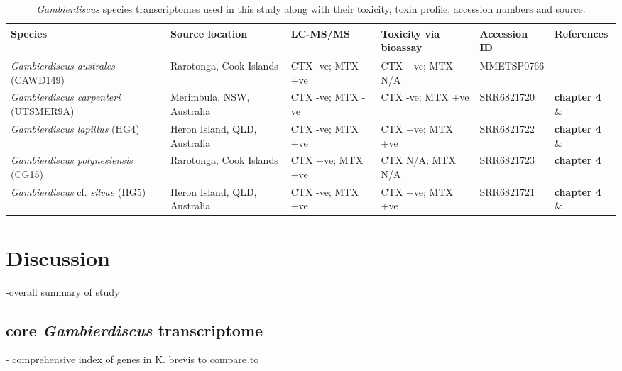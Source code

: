 \documentclass[12pt]{article}
\begin{document}
\begin{table}
\caption{\emph{Gambierdiscus} species transcriptomes used in this study along with their toxicity, toxin profile, accession numbers and source.}
\label{tbl:SeqTable}
\begin{tabular}{ | p{3cm} | p{2cm} | p{2.5cm} | p{2.5cm} | p{2cm} | p{2cm}|}
\hline
\textbf{Species} & \textbf{Source location}&\textbf{LC-MS/MS} & \textbf{Toxicity via bioassay} & \textbf{Accession ID} & \textbf{References} \\
\hline
\textit{Gambierdiscus australes} (CAWD149)&Rarotonga, Cook Islands& CTX -ve; MTX +ve&CTX +ve; MTX N/A&MMETSP0766&\cite{keeling2014marine,rhodes2010toxic,rhodes2014production,munday2017ciguatoxins}\\
\hline
\textit{Gambierdiscus carpenteri} (UTSMER9A)&Merimbula, NSW, Australia&CTX -ve; MTX -ve&CTX -ve; MTX +ve&SRR6821720
&\textbf{chapter 4} \& \cite{larsson2018toxicology}\\
\hline
\textit{Gambierdiscus lapillus} (HG4)&Heron Island, QLD, Australia&CTX -ve; MTX +ve&CTX +ve; MTX +ve&SRR6821722
&\textbf{chapter 4} \& \cite{larsson2018toxicology,kretzschmar2017characterization}\\
\hline
\textit{Gambierdiscus polynesiensis} (CG15)&Rarotonga, Cook Islands&CTX +ve; MTX +ve&CTX N/A; MTX N/A&SRR6821723
&\textbf{chapter 4} \\
\hline
\textit{Gambierdiscus} cf. \textit{silvae} (HG5)&Heron Island, QLD, Australia&CTX -ve; MTX +ve&CTX +ve; MTX +ve&SRR6821721
&\textbf{chapter 4} \& \cite{larsson2018toxicology,kretzschmar2017characterization}\\
\hline
\end{tabular}
\end{table}
\FloatBarrier
\newpage
\section*{Discussion}
-overall summary of study
\subsection*{core \textit{Gambierdiscus} transcriptome}
- \cite{lidie2005gene} comprehensive index of genes in K. brevis to compare to 
\end{document}
